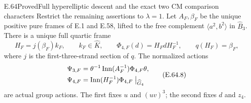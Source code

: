 \begin{statement}{E.64}{Proved}{Full hyperelliptic descent and the exact two CM comparison characters}
Restrict the remaining assertions to $\lambda=1$.  Let $A_F,
\beta_F$ be the unique positive pure frames of E.1 and E.58, lifted
to the free complement $\langle a^2,b^2\rangle$ in $\widehat B_3$.
There is a unique full quartic frame
\[
 H_F=j(\beta_F)k_F,\qquad k_F\in\widehat K,
 \qquad \Phi_{4,F}(d)=H_FdH_F^{-1},
 \qquad q(H_F)=\beta_F,
 \tag{E.64.7}
\]
where $j$ is the first-three-strand section of $q$.  The normalized
actions
\[
 \begin{split}
 \Psi_{3,F}&=\theta^{-1}\operatorname{Inn}(A_F^{-1})
                                    \Phi_{4,F}\theta,\\
 \Psi_{4,F}&=\operatorname{Inn}(H_F^{-1})\Phi_{4,F}
                                  \bigm|_{\widehat G_4}
 \end{split}
 \tag{E.64.8}
\]
are actual group actions.  The first fixes $u$ and $(uv)^3$;
the second fixes $d$ and $z_4$.


\end{statement}
